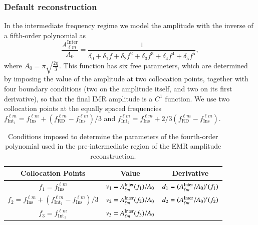 \documentclass[twocolumn,prd,aps,superscriptaddress,preprintnumbers,tightenlines,showpacs,nofootinbib,eqsecnum,amsfonts,amsmath]{revtex4}
\begin{document}
\subsubsection{Default reconstruction}
In the intermediate frequency regime we model the amplitude
with the inverse of a fifth-order polynomial as
\begin{equation}\label{eq:AmpInter}
\frac{A_{\ell m}^{\mathrm{Inter}}}{A_0} = \frac{1}{\delta_0 + \delta_1 f + \delta_2 f^2 + \delta_3 f^3 + \delta_4 f^4 + \delta_5 f^5},
\end{equation} 
where $A_0 =  \pi \sqrt{\frac{2\eta}{3}}$. This function has six free parameters, which are determined by imposing the value of the amplitude at two collocation points, together with four boundary conditions (two on the amplitude itself, and two on its first derivative), so that the final IMR amplitude is a $C^1$ function. 
We use two collocation points at the equally spaced frequencies $f_{\mathrm{Int}_1}^{\ell m}=f_{\mathrm{Ins}}^{\ell m} + (f_{\mathrm{RD}}^{\ell m}-f_{\mathrm{Ins}}^{\ell m})/3$ and $f_{\mathrm{Int}_2}^{\ell m}=f_{\mathrm{Ins}}^{\ell m} + 2/3(f_{\mathrm{RD}}^{\ell m}-f_{\mathrm{Ins}}^{\ell m})$.

\begin{table}[h!]
\centering
\caption{Conditions imposed to determine the parameters of the fourth-order polynomial used in the pre-intermediate region of the EMR amplitude reconstruction.}
\label{tab:emr_inter_eqs}
{\renewcommand{\arraystretch}{1.5}
\begin{tabular}{|c|c|c|}
\hline
Collocation Points                              & Value                      & Derivative                            \\ \hline
$f_1=f_{\mathrm{Ins}}^{\ell m} $                                 & $v_1 = A^{\rm{Inter}}_{\ell m} (f_1)/A_0$ & $d_1 = (A^{\rm{Inter}}_{\ell m}/A_0)^{\prime} (f_1)$   \\
$f_2=f_{\mathrm{Ins}}^{\ell m}+(f_{\mathrm{Int_1}}^{\ell m}-f_{\mathrm{Ins}}^{\ell m})/3$ & $v_2 = A^{\rm{Inter}}_{\ell m} (f_2)/A_0$ & $d_2 = (A^{\rm{Inter}}_{\ell m}/A_0)^{\prime} (f_2)$                               \\
$f_3=f_{\mathrm{Int_1}}^{\ell m}$                            & $v_3 = A^{\rm{Inter}}_{\ell m} (f_3)/A_0$ &   \\ \hline
\end{tabular}}
\end{table}
\end{document}

